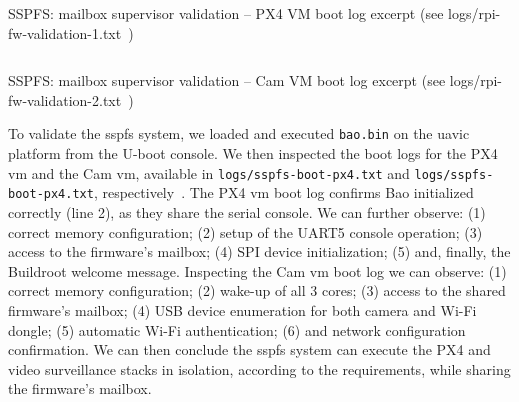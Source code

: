 \begin{longlisting}
\centering
\inputminted[]{kconfig}{./listing/rpi-fw-validation-1.txt}
\caption[SSPFS: mailbox supervisor validation -- PX4 VM boot log
(excerpt)]{SSPFS: mailbox supervisor validation -- PX4 VM boot log excerpt (see logs/rpi-fw-validation-1.txt~\cite{thesis-sw-github})}
\label{lst:rpi-fw-validation-1}
\end{longlisting}

\begin{longlisting}
\centering
\inputminted[]{kconfig}{./listing/rpi-fw-validation-2.txt}
\caption[SSPFS: mailbox supervisor validation -- Cam VM boot log
(excerpt)]{SSPFS: mailbox supervisor validation -- Cam VM boot log excerpt (see logs/rpi-fw-validation-2.txt~\cite{thesis-sw-github})}
\label{lst:rpi-fw-validation-2}
\end{longlisting}

To validate the \gls{sspfs} system, we loaded and executed \lstinline{bao.bin}
on the \gls{uavic} platform from the U-boot console.
We then inspected the boot logs for the PX4 \gls{vm} and the Cam \gls{vm},
available in \lstinline{logs/sspfs-boot-px4.txt} and
\lstinline{logs/sspfs-boot-px4.txt}, respectively~\cite{thesis-sw-github}.
The PX4 \gls{vm} boot log confirms Bao initialized correctly (line 2), as they
share the serial console. We can further observe: (1) correct memory
configuration; (2) setup of the UART5 console operation; (3) access to the
firmware's mailbox; (4) SPI device initialization; (5) and, finally, the Buildroot
welcome message. Inspecting the Cam \gls{vm} boot log we can observe: (1)
correct memory configuration; (2) wake-up of all 3 cores; (3) access to the
shared firmware's mailbox; (4) USB device enumeration for both camera and Wi-Fi
dongle; (5) automatic Wi-Fi authentication; (6) and network configuration
confirmation. We can then conclude the \gls{sspfs} system can execute the PX4
and video surveillance stacks in isolation, according to the requirements, while
sharing the firmware's mailbox.


